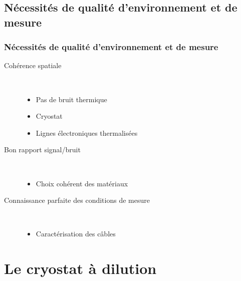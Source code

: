 \documentclass[10pt,a9paper,handout]{beamer} \usepackage[utf8]{inputenc} \usepackage[francais]{babel} \usepackage[T1]{fontenc}
\begin{document}
\subsection{Nécessités de qualité d'environnement et de mesure}
\begin{frame}
\frametitle{Nécessités de qualité d'environnement et de mesure}
\begin{description}
    \item[Cohérence spatiale] ~\\
    \begin{itemize}
        \item Pas de bruit thermique
        \item Cryostat
        \item Lignes électroniques thermalisées
    \end{itemize}
    \item[Bon rapport signal/bruit] ~\\
    \begin{itemize}
        \item Choix cohérent des matériaux
    \end{itemize}
    \item[Connaissance parfaite des conditions de mesure] ~\\
    \begin{itemize}
        \item Caractérisation des câbles
    \end{itemize}
\end{description}
\end{frame}

\section{Le cryostat à dilution}
\end{document}
